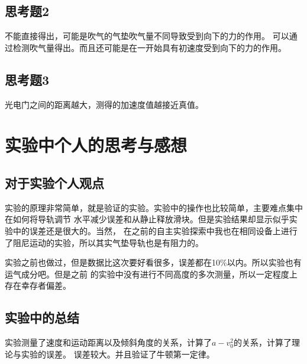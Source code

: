 \documentclass{ctexart}
\begin{document}
  \subsection{思考题2} 
  不能直接得出，可能是吹气的气垫吹气量不同导致受到向下的力的作用。
  可以通过检测吹气量得出。而且还可能是在一开始具有初速度受到向下的力的作用。
  \subsection{思考题3}
  光电门之间的距离越大，测得的加速度值越接近真值。
\newpage

\section{实验中个人的思考与感想}
  \subsection{对于实验个人观点}
  实验的原理非常简单，就是验证的实验。实验中的操作也比较简单，主要难点集中在如何将导轨调节
  水平减少误差和从静止释放滑块。但是实验结果却显示似乎实验中的误差还是很大的。当然，
  在之前的自主实验探索中我也在相同设备上进行了阻尼运动的实验，所以其实气垫导轨也是有阻力的。

  实验之前也做过，但是数据比这次要好看很多，误差都在10\%以内。所以实验也有运气成分吧。但是之前
  的实验中没有进行不同高度的多次测量，所以一定程度上存在幸存者偏差。
  \subsection{实验中的总结}
  实验测量了速度和运动距离以及倾斜角度的关系，计算了$a - v_{0}^2$的关系，计算了理论与实验的误差。
  误差较大。并且验证了牛顿第一定律。
\end{document}

